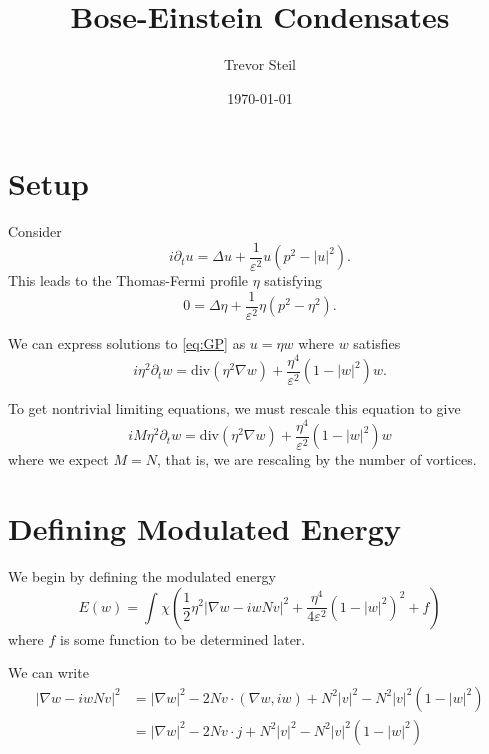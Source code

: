 \documentclass[a4paper]{article}
\title{Bose-Einstein Condensates }
\date{\today}
\author{Trevor Steil}
\renewcommand{\div}{\mathrm{div}}
\newlength{\horizspace}
\begin{document}
\maketitle

\setlength{\horizspace}{1.5cm}

\section{Setup}
Consider
\begin{equation} \label{eq:GP}
  i \partial_t u = \Delta u + \frac{1}{\varepsilon^2} u (p^2 - |u|^2).
\end{equation}
This leads to the Thomas-Fermi profile $\eta$ satisfying
\begin{equation} \label{eq:Thomas-Fermi}
  0 = \Delta \eta + \frac{1}{\varepsilon^2} \eta (p^2 - \eta^2).
\end{equation}

We can express solutions to \eqref{eq:GP} as $u = \eta w$ where $w$ satisfies
\begin{equation} \label{eq:PDE}
  i \eta^2 \partial_t w = \div ( \eta^2 \nabla w ) + \frac{\eta^4}{\varepsilon^2} ( 1 - |w|^2 ) w.
\end{equation}

To get nontrivial limiting equations, we must rescale this equation to give
\begin{equation}
  i M \eta^2 \partial_t w = \div ( \eta^2 \nabla w ) + \frac{\eta^4}{\varepsilon^2}(1 - |w|^2)w
  \label{eq:rescaled_PDE}
\end{equation}
where we expect $M = N$, that is, we are rescaling by the number of vortices.

\section{Defining Modulated Energy}

We begin by defining the modulated energy
\begin{equation}
  E(w) = \int_{}^{} \chi ( \frac{1}{2} \eta^2 | \nabla w - i w N v|^2 + \frac{\eta^4}{4 \varepsilon^2} (1 - |w|^2)^2 + f )
  \label{eq:modulated_energy1}
\end{equation}
where $f$ is some function to be determined later.

We can write
\begin{align*}
  | \nabla w - i w N v |^2 &= |\nabla w|^2 - 2 N v \cdot ( \nabla w, iw ) + N^2 |v|^2 - N^2 |v|^2 (1-|w|^2) \\
  &= | \nabla w |^2 - 2N v \cdot j + N^2 |v|^2 - N^2 |v|^2 ( 1 -|w|^2 )
\end{align*}
\end{document}
